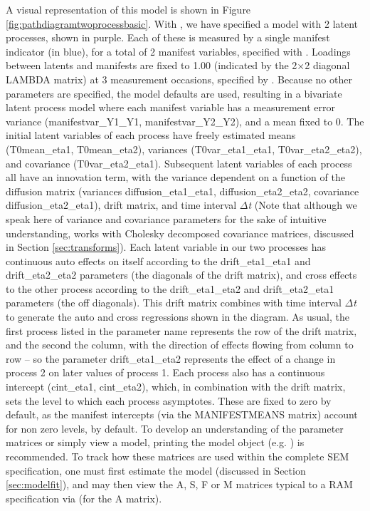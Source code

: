\documentclass[nojss]{jss}\usepackage[]{graphicx}\usepackage[]{color}
\begin{document}
A visual representation of this model is shown in Figure \ref{fig:pathdiagramtwoprocessbasic}. With , we have specified a model with 2 latent processes, shown in purple. Each of these is measured by a single manifest indicator (in blue), for a total of 2 manifest variables, specified with . Loadings between latents and manifests are fixed to 1.00 (indicated by the 2$\times$2 diagonal LAMBDA matrix) at 3 measurement occasions, specified by . Because no other parameters are specified, the model defaults are used, resulting in a bivariate latent process model where each manifest variable has a measurement error variance (manifestvar\_Y1\_Y1, manifestvar\_Y2\_Y2), and a mean fixed to 0. The initial latent variables of each process have freely estimated means (T0mean\_eta1, T0mean\_eta2), variances (T0var\_eta1\_eta1, T0var\_eta2\_eta2), and covariance (T0var\_eta2\_eta1). Subsequent latent variables of each process all have an innovation term, with the variance dependent on a function of the diffusion matrix (variances diffusion\_eta1\_eta1, diffusion\_eta2\_eta2, covariance diffusion\_eta2\_eta1), drift matrix, and time interval $\Delta$\textit{t} (Note that although we speak here of variance and covariance parameters for the sake of intuitive understanding,  works with Cholesky decomposed covariance matrices, discussed in Section \ref{sec:transforms}).
Each latent variable in our two processes has continuous auto effects on itself according to the drift\_eta1\_eta1 and drift\_eta2\_eta2 parameters (the diagonals of the drift matrix), and cross effects to the other process according to the drift\_eta1\_eta2 and drift\_eta2\_eta1 parameters (the off diagonals). This drift matrix combines with time interval $\Delta$\textit{t} to generate the auto and cross regressions shown in the diagram.  As usual, the first process listed in the parameter name represents the row of the drift matrix, and the second the column, with the direction of effects flowing from column to row -- so the parameter drift\_eta1\_eta2 represents the effect of a change in process 2 on later values of process 1. 
Each process also has a continuous intercept (cint{\_}eta1, cint{\_}eta2), which, in combination with the drift matrix, sets the level to which each process asymptotes. These are fixed to zero by default, as the manifest intercepts (via the MANIFESTMEANS matrix) account for non zero levels, by default.
To develop an understanding of the parameter matrices or simply view a model, printing the model object (e.g. ) is recommended. To track how these matrices are used within the complete SEM specification, one must first estimate the model (discussed in Section \ref{sec:modelfit}), and may then view the A, S, F or M matrices typical to a RAM specification \citet{mcardle1984algebraic} via  (for the A matrix).
\end{document}
